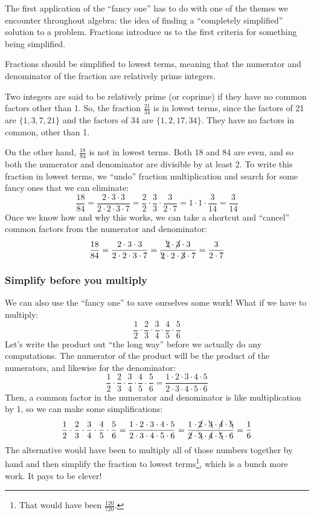 The first application of the ``fancy one'' has to do with one of the themes we encounter throughout algebra: the idea of finding a ``completely simplified'' solution to a problem. Fractions introduce us to the first criteria for something being simplified.

\begin{boxcrit}
Fractions should be simplified to \gls{lowest terms}, meaning that the numerator and denominator of the fraction are \gls{relatively prime} integers.
\end{boxcrit}

Two integers are said to be relatively prime (or coprime) if they have no common factors other than 1. So, the fraction $\frac{21}{34}$ is in lowest terms, since the factors of 21 are $\{1, 3, 7, 21\}$ and the factors of 34 are $\{1, 2, 17, 34\}$. They have no factors in common, other than 1.

On the other hand, $\frac{18}{84}$ is not in lowest terms. Both 18 and 84 are even, and so both the numerator and denominator are divisible by at least 2. To write this fraction in lowest terms, we ``undo'' fraction multiplication and search for some fancy ones that we can eliminate: \[\frac{18}{84} = \frac{2 \cdot 3 \cdot 3}{2 \cdot 2 \cdot 3 \cdot 7}  = \frac{2}{2}\cdot\frac{3}{3}\cdot\frac{3}{2\cdot 7} = 1\cdot1\cdot\frac{3}{14} = \frac{3}{14}\]
Once we know how and why this works, we can take a shortcut and ``cancel'' common factors from the numerator and denominator: \[\frac{18}{84} = \frac{2 \cdot 3 \cdot 3}{2 \cdot 2 \cdot 3 \cdot 7}=\frac{\bcancel{2} \cdot \cancel{3} \cdot 3}{\bcancel{2} \cdot 2 \cdot \cancel{3} \cdot 7}  = \frac{3}{2 \cdot 7}\]

\subsubsection{Simplify before you multiply}

We can also use the ``fancy one'' to save ourselves some work! What if we have to multiply:
\[\frac{1}{2} \cdot \frac{2}{3} \cdot \frac{3}{4} \cdot \frac{4}{5} \cdot \frac{5}{6}\]
Let's write the product out ``the long way'' before we actually do any computations. The numerator of the product will be the product of the numerators, and likewise for the denominator:
\[\frac{1}{2} \cdot \frac{2}{3} \cdot \frac{3}{4} \cdot \frac{4}{5} \cdot \frac{5}{6} = \frac{1 \cdot 2 \cdot 3 \cdot 4 \cdot 5}{2 \cdot 3 \cdot 4 \cdot 5 \cdot 6}\]
Then, a common factor in the numerator and denominator is like multiplication by 1, so we can make some simplifications:
\[\frac{1}{2} \cdot \frac{2}{3} \cdot \frac{3}{4} \cdot \frac{4}{5} \cdot \frac{5}{6} = \frac{1 \cdot 2 \cdot 3 \cdot 4 \cdot 5}{2 \cdot 3 \cdot 4 \cdot 5 \cdot 6} = \frac{1 \cdot \cancel{2} \cdot \bcancel{3} \cdot \cancel{4} \cdot \bcancel{5}}{\cancel{2} \cdot \bcancel{3} \cdot \cancel{4} \cdot \bcancel{5} \cdot 6} = \frac{1}{6}\]
The alternative would have been to multiply all of those numbers together by hand and then simplify the fraction to lowest terms\footnote{That would have been $\frac{120}{720}$.}, which is a bunch more work. It pays to be clever!


